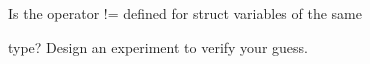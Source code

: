 Is the operator != defined for struct variables of the same

type? Design an experiment to verify your guess.

